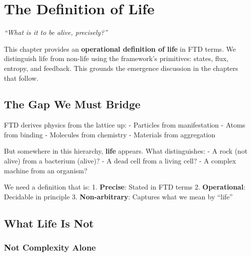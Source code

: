 \documentclass[
  11pt,
  letterpaper,
  twoside,
  openright]{book}
\begin{document}
\chapter{The Definition of Life}\label{sec-definition-life}

\emph{``What is it to be alive, precisely?''}

\begin{tcolorbox}[enhanced jigsaw, leftrule=.75mm, title=\textcolor{quarto-callout-note-color}{\faInfo}\hspace{0.5em}{Purpose of This Chapter}, bottomrule=.15mm, opacityback=0, coltitle=black, arc=.35mm, colframe=quarto-callout-note-color-frame, colbacktitle=quarto-callout-note-color!10!white, colback=white, titlerule=0mm, breakable, bottomtitle=1mm, toptitle=1mm, rightrule=.15mm, toprule=.15mm, left=2mm, opacitybacktitle=0.6]

This chapter provides an \textbf{operational definition of life} in FTD
terms. We distinguish life from non-life using the framework's
primitives: states, flux, entropy, and feedback. This grounds the
emergence discussion in the chapters that follow.

\end{tcolorbox}

\section{The Gap We Must Bridge}\label{the-gap-we-must-bridge}

FTD derives physics from the lattice up: - Particles from manifestation
- Atoms from binding - Molecules from chemistry - Materials from
aggregation

But somewhere in this hierarchy, \textbf{life} appears. What
distinguishes: - A rock (not alive) from a bacterium (alive)? - A dead
cell from a living cell? - A complex machine from an organism?

We need a definition that is: 1. \textbf{Precise}: Stated in FTD terms
2. \textbf{Operational}: Decidable in principle 3.
\textbf{Non-arbitrary}: Captures what we mean by ``life''

\section{What Life Is Not}\label{what-life-is-not}

\subsection{Not Complexity Alone}\label{not-complexity-alone}
\end{document}
